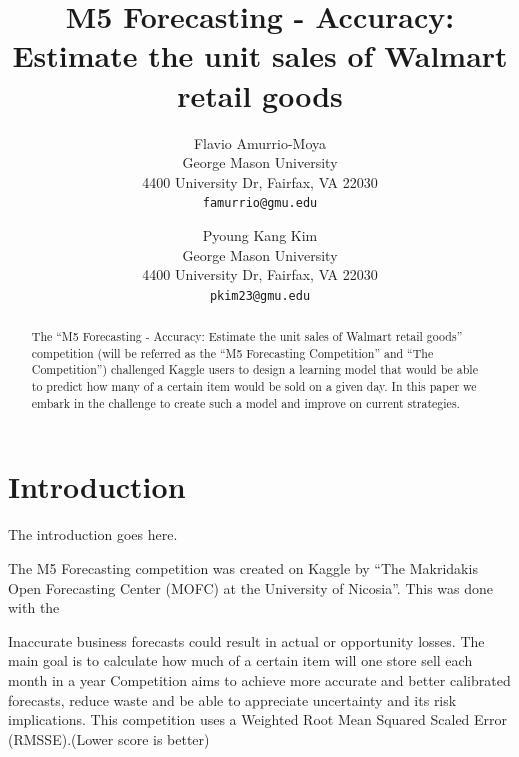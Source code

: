 \documentclass[10pt,twocolumn,letterpaper]{article}
\begin{document}
\title{M5 Forecasting - Accuracy: Estimate the unit sales of Walmart retail goods}

\author{Flavio Amurrio-Moya\\
George Mason University\\
4400 University Dr, Fairfax, VA 22030\\
{\tt\small famurrio@gmu.edu}
\and
Pyoung Kang Kim\\
George Mason University\\
4400 University Dr, Fairfax, VA 22030\\
{\tt\small pkim23@gmu.edu}
}

\maketitle
\thispagestyle{empty}

\begin{abstract}
  The ``M5 Forecasting - Accuracy: Estimate the unit sales of Walmart retail
  goods'' competition (will be referred as the ``M5 Forecasting Competition''
  and ``The Competition'') challenged Kaggle users to design a learning model
  that would be able to predict how many of a certain item would be sold
  on a given day. In this paper we embark in the challenge to create such a
  model and improve on current strategies.
\end{abstract}

\section{Introduction}
The introduction goes here.

The M5 Forecasting competition was created on Kaggle by ``The Makridakis Open
Forecasting Center (MOFC) at the University of Nicosia''. This was done with the

Inaccurate business forecasts could result in actual or opportunity losses.
The main goal is to calculate how much of a certain item will one store sell each month in a
year
Competition aims to achieve more accurate and better calibrated forecasts, reduce waste
and be able to appreciate uncertainty and its risk implications.
This competition uses a Weighted Root Mean Squared Scaled Error (RMSSE).(Lower
score is better)
\end{document}
